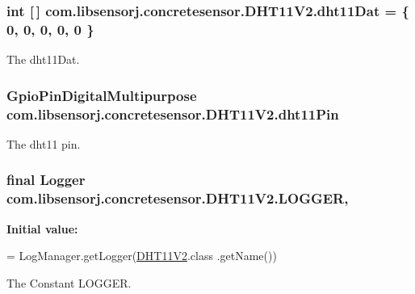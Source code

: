 \subsubsection[{dht11\+Dat}]{\setlength{\rightskip}{0pt plus 5cm}int \mbox{[}$\,$\mbox{]} com.\+libsensorj.\+concretesensor.\+D\+H\+T11\+V2.\+dht11\+Dat = \{ 0, 0, 0, 0, 0 \}\hspace{0.3cm}{\ttfamily [private]}}\label{classcom_1_1libsensorj_1_1concretesensor_1_1DHT11V2_a450dd7dfb4fdc23cd25523ad22890ee4}
The dht11\+Dat. \hypertarget{classcom_1_1libsensorj_1_1concretesensor_1_1DHT11V2_a04cca3ab141bcf0089fd6a7338a5dabe}{}
\subsubsection[{dht11\+Pin}]{\setlength{\rightskip}{0pt plus 5cm}Gpio\+Pin\+Digital\+Multipurpose com.\+libsensorj.\+concretesensor.\+D\+H\+T11\+V2.\+dht11\+Pin\hspace{0.3cm}{\ttfamily [private]}}\label{classcom_1_1libsensorj_1_1concretesensor_1_1DHT11V2_a04cca3ab141bcf0089fd6a7338a5dabe}
The dht11 pin. \hypertarget{classcom_1_1libsensorj_1_1concretesensor_1_1DHT11V2_acef19b315279adf9b39a4407487d401e}{}
\subsubsection[{L\+O\+G\+G\+E\+R}]{\setlength{\rightskip}{0pt plus 5cm}final Logger com.\+libsensorj.\+concretesensor.\+D\+H\+T11\+V2.\+L\+O\+G\+G\+E\+R\hspace{0.3cm}{\ttfamily [static]}, {\ttfamily [private]}}\label{classcom_1_1libsensorj_1_1concretesensor_1_1DHT11V2_acef19b315279adf9b39a4407487d401e}
{\bfseries Initial value\+:}
\begin{DoxyCode}
= LogManager.getLogger(\hyperlink{classcom_1_1libsensorj_1_1concretesensor_1_1DHT11V2_a19e1a415c048669c7b4879e02d852682}{DHT11V2}.class
            .getName())
\end{DoxyCode}
The Constant L\+O\+G\+G\+E\+R. \hypertarget{classcom_1_1libsensorj_1_1concretesensor_1_1DHT11V2_ad64749b474c180fea185aecd512eb656}{}
